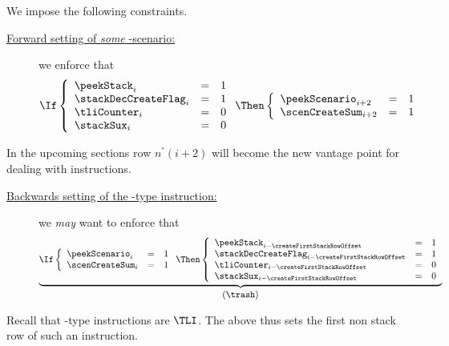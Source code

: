 We impose the following constraints.
\begin{description}
	\item[\underline{Forward setting of \emph{some} -scenario:}] we enforce that
		\[
			\If
			\left\{ \begin{array}{lcl}
				\peekStack          _{i} & = & 1 \\
				\stackDecCreateFlag _{i} & = & 1 \\
				\tliCounter         _{i} & = & 0 \\
				\stackSux           _{i} & = & 0 \\
			\end{array} \right.
			\Then
			\left\{ \begin{array}{lcl}
				\peekScenario  _{i + 2} & = & 1 \\
				\scenCreateSum _{i + 2} & = & 1 \\
			\end{array} \right.
		\]
\end{description}
\saNote{} In the upcoming sections row $n^°(i + 2)$ will become the new vantage point for dealing with  instructions.
\begin{description}
	\item[\underline{Backwards setting of the -type instruction:}] we \emph{may} want to enforce that
		\[
			\underbrace{\If
			\left\{ \begin{array}{lcl}
				\peekScenario  _{i} & = & 1 \\
				\scenCreateSum _{i} & = & 1 \\
			\end{array} \right.
			\Then
			\left\{ \begin{array}{lcl}
				\peekStack           _{i - \createFirstStackRowOffset} & = & 1 \\
				\stackDecCreateFlag  _{i - \createFirstStackRowOffset} & = & 1 \\
				\tliCounter          _{i - \createFirstStackRowOffset} & = & 0 \\
				\stackSux            _{i - \createFirstStackRowOffset} & = & 0 \\
			\end{array} \right.}_{\displaystyle (\trash)}
		\]
\end{description}
\saNote{} Recall that -type instructions are $\TLI$. The above thus sets the first non stack row of such an instruction. 
